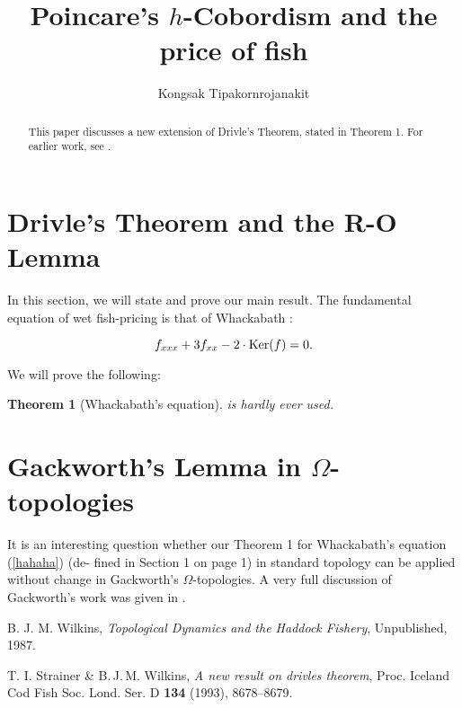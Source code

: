 \documentclass[12pt, a4paper]{article}
\newtheorem{theorem}{Theorem}
\begin{document}
 	\title{Poincare's $h$-Cobordism and the price of fish}
 	\author{Kongsak Tipakornrojanakit}
 	\maketitle
 	
 	\vspace{0.2in}
 	
 	\tableofcontents
 	
 	\vspace{0.4in}
 	
 	
 	\begin{abstract}
 		This paper discusses a new extension of Drivle's Theorem, stated in Theorem 1. For earlier work, see \cite{sw, bjm}.
 	\end{abstract}
 	
 	\section{Drivle's Theorem and the R-O Lemma}
 	In this section, we will state and prove our main result. The fundamental equation of wet fish-pricing is that of Whackabath \cite{sw}:
 	
		\begin{equation}\label{hahaha}
		f_{xxx} + 3f_{xx} - 2 \cdot  \textnormal{Ker}(f) = 0.
		\end{equation}
		
 	\noindent We will prove the following:
 	
 	\begin{theorem}
 	[Whackabath's equation]{\normalfont{(\ref{hahaha})} \textit{is hardly ever used.}}
	\end{theorem}
	
 	\section{Gackworth's Lemma in $\Omega$-topologies}
	It is an interesting question whether our Theorem 1 for Whackabath's equation (\ref{hahaha}) (de- fined in Section 1 on page 1) in standard topology can be applied without change in Gackworth's $\Omega$-topologies. A very full discussion of Gackworth's work was given in \cite{bjm}.

 	\begin{thebibliography}{9}
 	B. J. M. Wilkins,
 	\emph{Topological Dynamics and the Haddock Fishery},
 	Unpublished, 1987.

 	T. I. Strainer \& B.\,J.\,M. Wilkins,
 	\emph{A new result on drivles theorem},
 	Proc. Iceland Cod Fish Soc. Lond. Ser. D \textbf{134} (1993), 8678--8679.
 	\end{thebibliography}
 	
 	
 	
\end{document}
